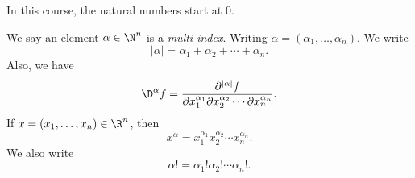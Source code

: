 \documentclass[a4paper]{article}
\begin{document}
%
%

In this course, the natural numbers start at $0$.
\begin{notation}
  We say an element $\alpha \in \N^n$ is a \emph{multi-index}. Writing $\alpha = (\alpha_1, \ldots, \alpha_n)$. We write
  \[
    |\alpha| = \alpha_1 + \alpha_2 + \cdots + \alpha_n.
  \]
  Also, we have
  \[
    \D^\alpha f = \frac{\partial^{|\alpha|}f}{\partial x_1^{\alpha_1} \partial x_2^{\alpha_2} \cdots \partial x_n^{\alpha_n}}.
  \]
  If $x = (x_1, \ldots, x_n) \in \R^n$, then
  \[
    x^\alpha = x_1^{\alpha_1} x_2^{\alpha_2} \cdots x_n^{\alpha_n}.
  \]
  We also write
  \[
    \alpha! = \alpha_1! \alpha_2! \cdots \alpha_n!.
  \]
\end{notation}
\end{document}

